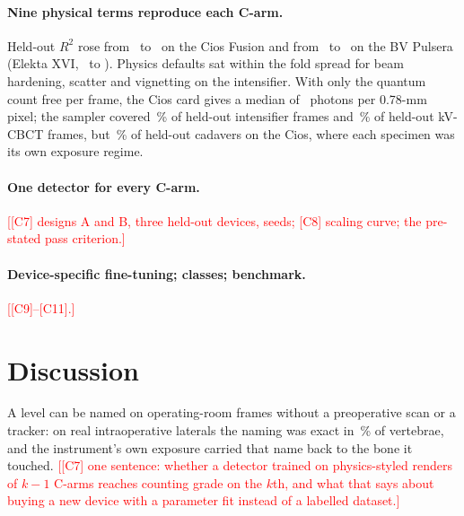 \documentclass[11pt,letterpaper]{article}
\newcommand{\todo}[1]{\textcolor{red}{[#1]}}
\begin{document}
\paragraph{Nine physical terms reproduce each C-arm.} Held-out $R^2$ rose from \clCardCiosRTwoBaseline\ to \clCardCiosRTwoHeldout\ on the Cios Fusion and from \clCardPulseraRTwoBaseline\ to \clCardPulseraRTwoHeldout\ on the BV Pulsera (Elekta XVI, \clCardElektaRTwoBaseline\ to \clCardElektaRTwoHeldout). Physics defaults sat within the fold spread for beam hardening, scatter and vignetting on the intensifier. With only the quantum count free per frame, the Cios card gives a median of \clCardCiosPhotonsMedianPerFitPx\ photons per 0.78-mm pixel; the sampler covered \clCardPulseraTypicalityNineNine\,\% of held-out intensifier frames and \clCardElektaTypicalityNineNine\,\% of held-out kV-CBCT frames, but \clCardCiosTypicalityNineNine\,\% of held-out cadavers on the Cios, where each specimen was its own exposure regime.
\paragraph{One detector for every C-arm.} \todo{[C7] designs A and B, three held-out devices, seeds; [C8] scaling curve; the pre-stated pass criterion.}
\paragraph{Device-specific fine-tuning; classes; benchmark.} \todo{[C9]--[C11].}

\section*{Discussion}
A level can be named on operating-room frames without a preoperative scan or a tracker: on real intraoperative
laterals the naming was exact in \clCarmCvFiveLatWholeExact\,\% of vertebrae, and the instrument's own exposure
carried that name back to the bone it touched. \todo{[C7] one sentence: whether a detector trained on physics-styled
renders of $k-1$ C-arms reaches counting grade on the $k$th, and what that says about buying a new device with a
parameter fit instead of a labelled dataset.}
\end{document}
